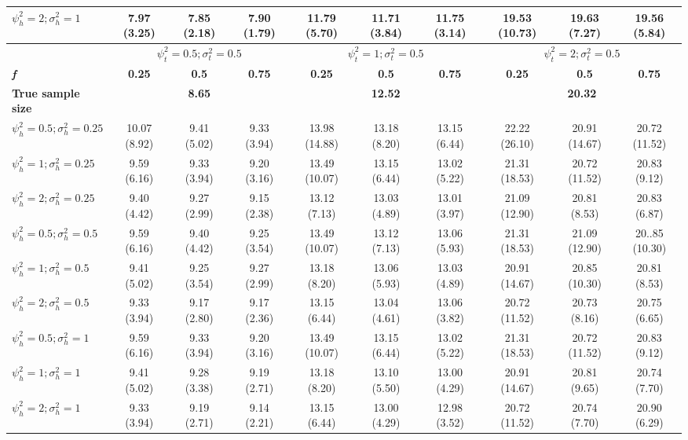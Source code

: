 \begin{table}[ht!]
{\begin{tabular}{l c c c c c c c c c}
$\psi_h^2 = 2; \sigma_h^2 = 1$ & 7.97 (3.25) & 7.85 (2.18) & 7.90 (1.79) & 11.79 (5.70) & 11.71 (3.84) & 11.75 (3.14) & 19.53 (10.73) & 19.63 (7.27) & 19.56 (5.84) \\
\hline 
 & \multicolumn{3}{c}{$\psi_t^2 = 0.5; \sigma_t^2 = 0.5$} & \multicolumn{3}{c}{$\psi_t^2 = 1; \sigma_t^2 = 0.5$} & \multicolumn{3}{c}{$\psi_t^2= 2; \sigma_t^2 = 0.5$} \\
\cline{2-10}
\textbf{\textit{f}} & \textbf{0.25} & \textbf{0.5} & \textbf{0.75} & \textbf{0.25} & \textbf{0.5} & \textbf{0.75} & \textbf{0.25} & \textbf{0.5} & \textbf{0.75} \\
\hline
\textbf{True sample size} & \multicolumn{3}{c}{\textbf{8.65}} & \multicolumn{3}{c}{\textbf{12.52}} & \multicolumn{3}{c}{\textbf{20.32}} \\
$\psi_h^2 = 0.5; \sigma_h^2 = 0.25$ & 10.07 (8.92) & 9.41 (5.02) & 9.33 (3.94) & 13.98 (14.88) & 13.18 (8.20) & 13.15 (6.44) & 22.22 (26.10) & 20.91 (14.67) & 20.72 (11.52) \\
$\psi_h^2 = 1; \sigma_h^2 = 0.25$ & 9.59 (6.16) & 9.33 (3.94) & 9.20 (3.16) & 13.49 (10.07) & 13.15 (6.44) & 13.02 (5.22) & 21.31 (18.53) & 20.72 (11.52) & 20.83 (9.12) \\
$\psi_h^2 = 2; \sigma_h^2 = 0.25$ & 9.40 (4.42) & 9.27 (2.99) & 9.15 (2.38) & 13.12 (7.13) & 13.03 (4.89) & 13.01 (3.97) & 21.09 (12.90) & 20.81 (8.53) & 20.83 (6.87) \\
$\psi_h^2 = 0.5; \sigma_h^2 = 0.5$ & 9.59 (6.16) & 9.40 (4.42) & 9.25 (3.54) & 13.49 (10.07) & 13.12 (7.13) & 13.06 (5.93) & 21.31 (18.53) & 21.09 (12.90) & 20..85 (10.30) \\
$\psi_h^2 = 1; \sigma_h^2 = 0.5$ & 9.41 (5.02) & 9.25 (3.54) & 9.27 (2.99) & 13.18 (8.20) & 13.06 (5.93) & 13.03 (4.89) & 20.91 (14.67) & 20.85 (10.30) & 20.81 (8.53) \\
$\psi_h^2 = 2; \sigma_h^2 = 0.5$ & 9.33 (3.94) & 9.17 (2.80) & 9.17 (2.36) & 13.15 (6.44) & 13.04 (4.61) & 13.06 (3.82) & 20.72 (11.52) & 20.73 (8.16) & 20.75 (6.65) \\
$\psi_h^2 = 0.5; \sigma_h^2 = 1$ & 9.59 (6.16) & 9.33 (3.94) & 9.20 (3.16) & 13.49 (10.07) & 13.15 (6.44) & 13.02 (5.22) & 21.31 (18.53) &  20.72 (11.52) & 20.83 (9.12) \\
$\psi_h^2 = 1; \sigma_h^2 = 1$ & 9.41 (5.02) & 9.28 (3.38) & 9.19 (2.71) & 13.18 (8.20) & 13.10 (5.50) & 13.00 (4.29) & 20.91 (14.67) & 20.81 (9.65) & 20.74 (7.70) \\
$\psi_h^2 = 2; \sigma_h^2 = 1$ & 9.33 (3.94) & 9.19 (2.71) & 9.14 (2.21) & 13.15 (6.44) & 13.00 (4.29) & 12.98 (3.52) & 20.72 (11.52) & 20.74 (7.70) & 20.90 (6.29) \\

\end{tabular}}
\end{table}
